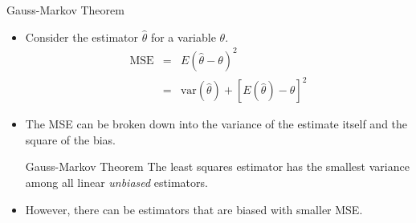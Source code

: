 \documentclass{beamer}
\begin{document}
\begin{frame}{Gauss-Markov Theorem}
    \begin{itemize}
        \item Consider the estimator $\hat{\theta}$ for a variable $\theta$.
        \begin{eqnarray*}
            \mathrm{MSE} & = & E(\hat{\theta} - \theta)^2 \\
            & = & \mathrm{var}(\hat{\theta}) + [E(\hat{\theta}) - \theta]^2
        \end{eqnarray*}
        \item The MSE can be broken down into the variance of the estimate itself and the square of the bias.
        \begin{block}{Gauss-Markov Theorem}
        The least squares estimator has the smallest variance among all linear \textit{unbiased} estimators.
        \end{block}
        \item However, there can be estimators that are biased with smaller MSE.
    \end{itemize}
\end{frame}
\end{document}
